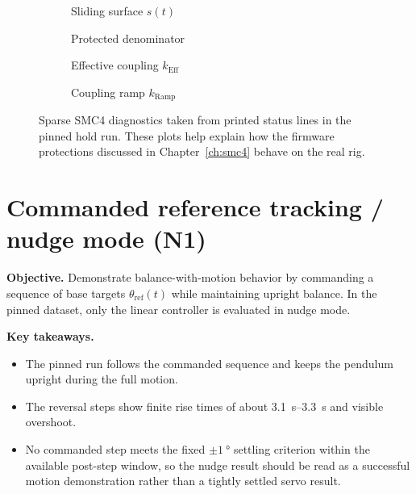 \begin{figure}[htbp]
  \centering
  \begin{subfigure}[t]{0.48\linewidth}
    \centering
    \caption{Sliding surface $s(t)$}
  \end{subfigure}\hfill
  \begin{subfigure}[t]{0.48\linewidth}
    \centering
    \caption{Protected denominator}
  \end{subfigure}

  \medskip

  \begin{subfigure}[t]{0.48\linewidth}
    \centering
    \caption{Effective coupling $k_{\mathrm{Eff}}$}
  \end{subfigure}\hfill
  \begin{subfigure}[t]{0.48\linewidth}
    \centering
    \caption{Coupling ramp $k_{\mathrm{Ramp}}$}
  \end{subfigure}
  \caption{Sparse SMC4 diagnostics taken from printed status lines in the pinned hold run. These plots help explain how the firmware protections discussed in Chapter~\ref{ch:smc4} behave on the real rig.}
  \label{fig:hold_smc4_support}
\end{figure}
\clearpage

\section{Commanded reference tracking / nudge mode (N1)}
\noindent\textbf{Objective.} Demonstrate balance-with-motion behavior by commanding a sequence of base targets $\theta_{\mathrm{ref}}(t)$ while maintaining upright balance. In the pinned dataset, only the linear controller is evaluated in nudge mode.

\noindent\textbf{Key takeaways.}
\begin{itemize}
  \item The pinned run follows the commanded sequence and keeps the pendulum upright during the full motion.
  \item The reversal steps show finite rise times of about \SIrange{3.1}{3.3}{s} and visible overshoot.
  \item No commanded step meets the fixed $\pm\SI{1}{\degree}$ settling criterion within the available post-step window, so the nudge result should be read as a successful motion demonstration rather than a tightly settled servo result.
\end{itemize}

